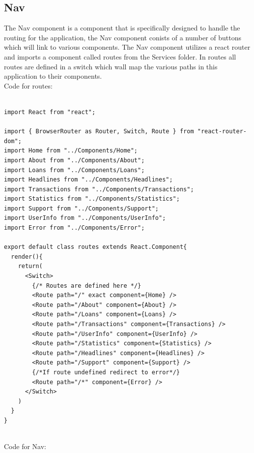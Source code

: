 \subsection{Nav}
The Nav component is a component that is specifically designed to handle the routing
for the application, the Nav component conists of a number of buttons which will link
to various components.  The Nav component utilizes a react router and imports a component
called routes from the Services folder.  In routes all routes are defined in a switch which
wall map the various paths in this application to their components.
\\
Code for routes:
\begin{verbatim}

import React from "react";

import { BrowserRouter as Router, Switch, Route } from "react-router-dom";
import Home from "../Components/Home";
import About from "../Components/About";
import Loans from "../Components/Loans";
import Headlines from "../Components/Headlines";
import Transactions from "../Components/Transactions";
import Statistics from "../Components/Statistics";
import Support from "../Components/Support";
import UserInfo from "../Components/UserInfo";
import Error from "../Components/Error";

export default class routes extends React.Component{
  render(){
    return(
      <Switch>
        {/* Routes are defined here */}
        <Route path="/" exact component={Home} />
        <Route path="/About" component={About} />
        <Route path="/Loans" component={Loans} />
        <Route path="/Transactions" component={Transactions} />
        <Route path="/UserInfo" component={UserInfo} />
        <Route path="/Statistics" component={Statistics} />
        <Route path="/Headlines" component={Headlines} />
        <Route path="/Support" component={Support} />
        {/*If route undefined redirect to error*/}
        <Route path="/*" component={Error} />
      </Switch>
    )
  }
}

\end{verbatim}
\\
Code for Nav:
